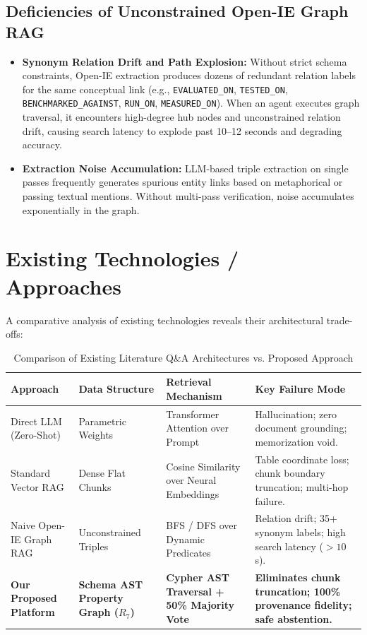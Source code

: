 \subsection{Deficiencies of Unconstrained Open-IE Graph RAG}
\begin{itemize}
    \item \textbf{Synonym Relation Drift and Path Explosion:} Without strict schema constraints, Open-IE extraction produces dozens of redundant relation labels for the same conceptual link (e.g., \texttt{EVALUATED\_ON}, \texttt{TESTED\_ON}, \texttt{BENCHMARKED\_AGAINST}, \texttt{RUN\_ON}, \texttt{MEASURED\_ON}). When an agent executes graph traversal, it encounters high-degree hub nodes and unconstrained relation drift, causing search latency to explode past 10–12 seconds and degrading accuracy.
    \item \textbf{Extraction Noise Accumulation:} LLM-based triple extraction on single passes frequently generates spurious entity links based on metaphorical or passing textual mentions. Without multi-pass verification, noise accumulates exponentially in the graph.
\end{itemize}

\section{Existing Technologies / Approaches}
A comparative analysis of existing technologies reveals their architectural trade-offs:
\begin{table}[h]
\centering
\caption{Comparison of Existing Literature Q\&A Architectures vs. Proposed Approach}
\label{tab:existing_tech_comp}
\small
\begin{tabular}{p{3.2cm}p{2.8cm}p{3.2cm}p{4.2cm}}
\toprule
\textbf{Approach} & \textbf{Data Structure} & \textbf{Retrieval Mechanism} & \textbf{Key Failure Mode} \\
\midrule
Direct LLM (Zero-Shot) & Parametric Weights & Transformer Attention over Prompt & Hallucination; zero document grounding; memorization void. \\
\midrule
Standard Vector RAG & Dense Flat Chunks & Cosine Similarity over Neural Embeddings & Table coordinate loss; chunk boundary truncation; multi-hop failure. \\
\midrule
Naive Open-IE Graph RAG & Unconstrained Triples & BFS / DFS over Dynamic Predicates & Relation drift; 35+ synonym labels; high search latency ($>10$s). \\
\midrule
\textbf{Our Proposed Platform} & \textbf{Schema AST Property Graph ($R_7$)} & \textbf{Cypher AST Traversal + 50\% Majority Vote} & \textbf{Eliminates chunk truncation; 100\% provenance fidelity; safe abstention.} \\
\bottomrule
\end{tabular}
\end{table}

